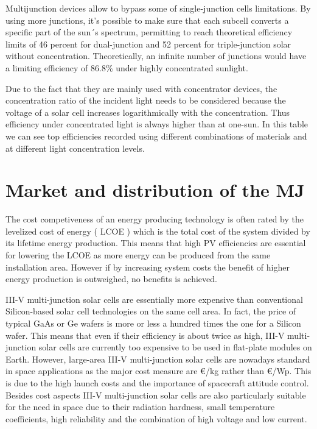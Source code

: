 \documentclass[11pt]{article} %
\begin{document}
Multijunction devices allow to bypass some of single-junction cells limitations. By using more junctions, it's possible to make sure that each subcell converts a specific part of the sun´s spectrum, permitting to reach theoretical efficiency limits of 46 percent for dual-junction and 52 percent for triple-junction solar without concentration. Theoretically, an infinite number of junctions would have a limiting efficiency of 86.8\% under highly concentrated sunlight.

Due to the fact that they are mainly used with concentrator devices, the concentration ratio of the incident light needs to be considered because the voltage of a solar cell increases logarithmically with the  concentration. Thus efficiency  under  concentrated  light is  always  higher  than  at one-sun. In this table we can see top efficiencies  recorded using different combinations of materials and at different light concentration levels.

\section{Market and distribution of the MJ}

The cost competiveness of an energy producing technology is often rated by the levelized cost of energy ( LCOE )  which is  the  total  cost  of  the  system  divided  by  its  lifetime  energy production. This means that high PV efficiencies  are  essential  for lowering  the  LCOE  as  more  energy can  be produced from the same installation area. However if by increasing system costs the  benefit  of  higher  energy  production is outweighed, no benefits is achieved.   

III-V multi-junction solar  cells  are essentially more expensive than conventional Silicon-based solar cell technologies on the same cell area. In fact, the price of typical GaAs or Ge wafers is more or less a hundred times the one for a Silicon wafer. This means that even if their efficiency is about twice as high, III-V multi-junction solar cells are currently too expensive to be used in flat-plate modules on Earth.   However, large-area III-V multi-junction solar cells are nowadays standard in space applications as the major cost measure are €/kg rather than €/Wp. This is due to the high launch costs and the importance of spacecraft attitude control. Besides cost aspects III-V multi-junction solar cells  are  also  particularly  suitable  for  the  need  in  space  due  to  their  radiation  hardness,  small temperature coefficients, high reliability and the combination of high voltage and low current. 
\end{document}
